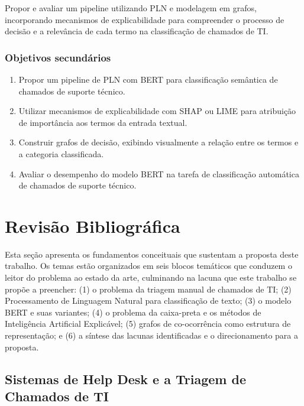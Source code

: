 \documentclass[
    12pt,                %
    openright,           %
    oneside,             %
    a4paper,             %
    english,             %
    brazil               %
]{abntex2}
\begin{document}
Propor e avaliar um pipeline utilizando PLN e modelagem em grafos, incorporando mecanismos de explicabilidade para compreender o processo de decisão e a relevância de cada termo na classificação de chamados de TI.

\subsection{Objetivos secundários}

\begin{enumerate}
    \item Propor um pipeline de PLN com BERT para classificação semântica de chamados de suporte técnico.

    \item Utilizar mecanismos de explicabilidade com SHAP ou LIME para atribuição de importância aos termos da entrada textual.

    \item Construir grafos de decisão, exibindo visualmente a relação entre os termos e a categoria classificada.

    \item Avaliar o desempenho do modelo BERT na tarefa de classificação automática de chamados de suporte técnico.
\end{enumerate}

\chapter{Revisão Bibliográfica}
\label{cap:revisao}

Esta seção apresenta os fundamentos conceituais que sustentam a proposta deste trabalho. Os temas estão organizados em seis blocos temáticos que conduzem o leitor do problema ao estado da arte, culminando na lacuna que este trabalho se propõe a preencher: (1) o problema da triagem manual de chamados de TI; (2) Processamento de Linguagem Natural para classificação de texto; (3) o modelo BERT e suas variantes; (4) o problema da caixa-preta e os métodos de Inteligência Artificial Explicável; (5) grafos de co-ocorrência como estrutura de representação; e (6) a síntese das lacunas identificadas e o direcionamento para a proposta.

\section{Sistemas de Help Desk e a Triagem de Chamados de TI}
\label{sec:helpdesk}
\end{document}
